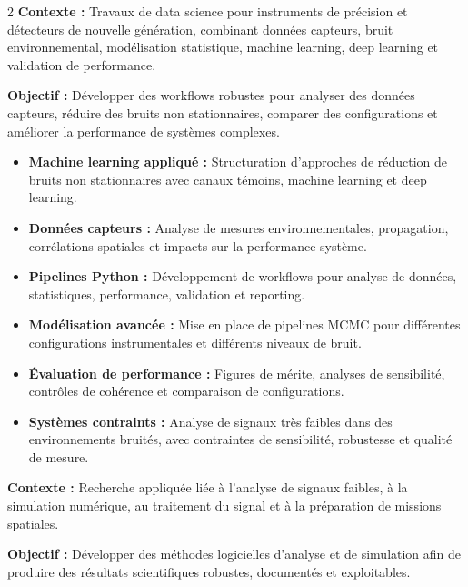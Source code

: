 \documentclass[8pt,a4paper,ragged2e,withhyper]{altacv}
\begin{document}
\begin{paracol}{2}
\textbf{Contexte :} Travaux de data science pour instruments de précision et détecteurs de nouvelle génération, combinant données capteurs, bruit environnemental, modélisation statistique, machine learning, deep learning et validation de performance.

\textbf{Objectif :} Développer des workflows robustes pour analyser des données capteurs, réduire des bruits non stationnaires, comparer des configurations et améliorer la performance de systèmes complexes.

\begin{itemize}
  \item \textbf{Machine learning appliqué :} Structuration d’approches de réduction de bruits non stationnaires avec canaux témoins, machine learning et deep learning.
  \item \textbf{Données capteurs :} Analyse de mesures environnementales, propagation, corrélations spatiales et impacts sur la performance système.
  \item \textbf{Pipelines Python :} Développement de workflows pour analyse de données, statistiques, performance, validation et reporting.
  \item \textbf{Modélisation avancée :} Mise en place de pipelines MCMC pour différentes configurations instrumentales et différents niveaux de bruit.
  \item \textbf{Évaluation de performance :} Figures de mérite, analyses de sensibilité, contrôles de cohérence et comparaison de configurations.
  \item \textbf{Systèmes contraints :} Analyse de signaux très faibles dans des environnements bruités, avec contraintes de sensibilité, robustesse et qualité de mesure.
\end{itemize}

\divider


\textbf{Contexte :} Recherche appliquée liée à l’analyse de signaux faibles, à la simulation numérique, au traitement du signal et à la préparation de missions spatiales.

\textbf{Objectif :} Développer des méthodes logicielles d’analyse et de simulation afin de produire des résultats scientifiques robustes, documentés et exploitables.


\end{paracol}
\end{document}
